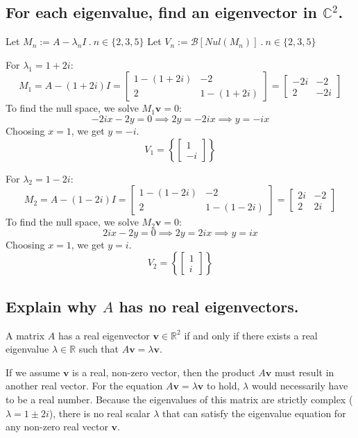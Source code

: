 \subsection{For each eigenvalue, find an eigenvector in $\mathbb{C}^2$.}
\begin{center}
	Let $M_n := A-\lambda_n I ~.~ n \in \{ 2,3,5 \}$ \quad\quad Let $V_n := \mathscr{B}[Nul(M_n)] ~.~ n \in \{ 2,3,5 \}$
\end{center}

For $\lambda_1 = 1+2i$:
\[
	M_1 = A-(1+2i)I =
	\begin{bmatrix}
		1-(1+2i) & -2       \\
		2        & 1-(1+2i)
	\end{bmatrix} =
	\begin{bmatrix}
		-2i & -2  \\
		2   & -2i
	\end{bmatrix}
\]
To find the null space, we solve $M_1 \mathbf{v} = 0$:
\[
	-2ix - 2y = 0 \implies 2y = -2ix \implies y = -ix
\]
Choosing $x=1$, we get $y=-i$.
\[
	V_1 = \left\{ \begin{bmatrix} 1 \\ -i \end{bmatrix} \right\}
\]

For $\lambda_2 = 1-2i$:
\[
	M_2 = A-(1-2i)I =
	\begin{bmatrix}
		1-(1-2i) & -2       \\
		2        & 1-(1-2i)
	\end{bmatrix} =
	\begin{bmatrix}
		2i & -2 \\
		2  & 2i
	\end{bmatrix}
\]
To find the null space, we solve $M_2 \mathbf{v} = 0$:
\[
	2ix - 2y = 0 \implies 2y = 2ix \implies y = ix
\]
Choosing $x=1$, we get $y=i$.
\[
	V_2 = \left\{ \begin{bmatrix} 1 \\ i \end{bmatrix} \right\}
\]

\subsection{Explain why $A$ has no real eigenvectors.}
A matrix $A$ has a real eigenvector $\mathbf{v} \in \mathbb{R}^2$ if and only if there exists a real eigenvalue $\lambda \in \mathbb{R}$ such that $A\mathbf{v} = \lambda\mathbf{v}$.

If we assume $\mathbf{v}$ is a real, non-zero vector, then the product $A\mathbf{v}$ must result in another real vector. For the equation $A\mathbf{v} = \lambda\mathbf{v}$ to hold, $\lambda$ would necessarily have to be a real number. Because the eigenvalues of this matrix are strictly complex ($\lambda = 1 \pm 2i$), there is no real scalar $\lambda$ that can satisfy the eigenvalue equation for any non-zero real vector $\mathbf{v}$.

